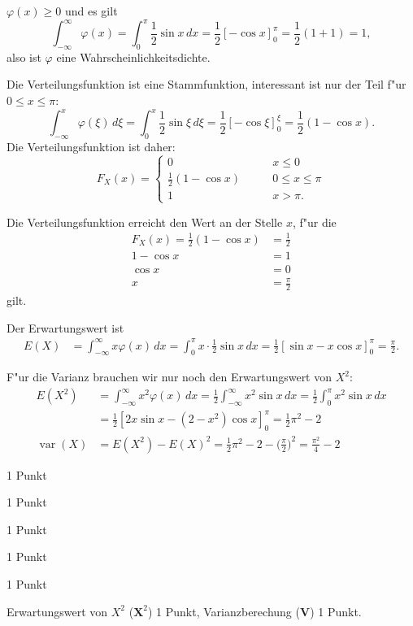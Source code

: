 \begin{loesung}
\begin{teilaufgaben}
\item
$\varphi(x)\ge 0$ und es gilt
\[
\int_{-\infty}^\infty\varphi(x)=\int_0^\pi\frac12\sin x\,dx
=
\frac12\left[-\cos x\right]_0^\pi=\frac12(1+1)=1,
\]
also ist $\varphi$ eine Wahrscheinlichkeitsdichte.
\item
Die Verteilungsfunktion ist eine Stammfunktion, interessant ist nur
der Teil f"ur $0\le x\le \pi$:
\[
\int_{-\infty}^x\varphi(\xi)\,d\xi
=
\int_0^x\frac12\sin\xi\,d\xi
=
\frac12\left[-\cos\xi\right]_0^\xi=\frac12(1-\cos x).
\]
Die Verteilungsfunktion ist daher:
\[
F_X(x)=\begin{cases}
0&\qquad x\le 0\\
\frac12(1-\cos x)&\qquad 0\le x\le \pi\\
1&\qquad x > \pi.
\end{cases}
\]
\item Die Verteilungsfunktion erreicht den Wert an der Stelle $x$, f"ur die
\begin{align*}
F_X(x)=\frac12(1-\cos x)&=\frac12\\
1-\cos x&=1\\
\cos x&=0\\
x&=\frac{\pi}2
\end{align*}
gilt.
\item
Der Erwartungswert ist
\begin{align*}
E(X)
&=
\int_{-\infty}^\infty x\varphi(x)\,dx
=
\int_0^\pi x\cdot\frac12\sin x\,dx
=
\frac12
\left[\sin x-x\cos x\right]_0^\pi=\frac{\pi}2.
\end{align*}
\item
F"ur die Varianz brauchen wir nur noch den Erwartungswert von $X^2$:
\begin{align*}
E(X^2)
&=
\int_{-\infty}^\infty x^2\varphi(x)\,dx
=
\frac12\int_{-\infty}^\infty x^2\sin x\,dx
=
\frac12\int_0^\pi x^2\sin x\,dx 
\\
&=
\frac12\left[
2x\sin x-(2-x^2)\cos x
\right]_0^\pi
=
\frac12\pi^2-2
\\
\operatorname{var}(X)&=E(X^2)-E(X)^2=
\frac12\pi^2-2-\biggl(\frac{\pi}2\biggr)^2
=\frac{\pi^2}4-2
\end{align*}
\end{teilaufgaben}
\end{loesung}

\begin{bewertung}
\begin{teilaufgaben}
\item 1 Punkt
\item 1 Punkt
\item 1 Punkt
\item 1 Punkt
\item 1 Punkt
\item Erwartungswert von $X^2$ ($\textbf{X}^2$) 1 Punkt,
Varianzberechung (\textbf{V}) 1 Punkt.
\end{teilaufgaben}
\end{bewertung}

